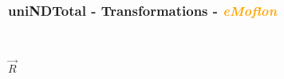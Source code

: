 \documentclass{beamer}
\begin{document}
\begin{frame}
\frametitle{uniNDTotal - \textbf{Transformations} - \textbf{\textit{\textcolor{orange}{eMoflon}}}}
\begin{figure}[ht]
\begin{mdframed}
    \centering
    \mbox{\qquad\qquad\qquad
          }
\end{mdframed}          
    \label{fig:T1}
\end{figure}

\begin{center}
$\overrightarrow{R}$
\end{center}

\begin{figure}[ht]
    \centering
    \mbox{
          }
    \label{fig:T3}
\end{figure}

\end{frame}
\end{document}
